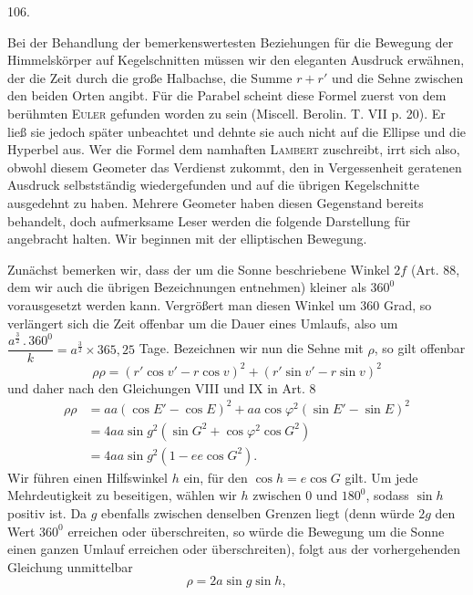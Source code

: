 \par{}\medskip
\hypertarget{native-146-article106}{}
\begin{center}106.\end{center}
Bei der Behandlung der bemerkenswertesten Beziehungen für die Bewegung der Himmelskörper auf Kegelschnitten müssen wir den eleganten Ausdruck erwähnen, der die Zeit durch die große Halbachse, die Summe $r+r'$ und die Sehne zwischen den beiden Orten angibt. Für die Parabel scheint diese Formel zuerst von dem berühmten \textsc{Euler} gefunden worden zu sein (Miscell. Berolin. T. VII p. 20). Er ließ sie jedoch später unbeachtet und dehnte sie auch nicht auf die Ellipse und die Hyperbel aus. Wer die Formel dem namhaften \textsc{Lambert} zuschreibt, irrt sich also, obwohl diesem Geometer das Verdienst zukommt, den in Vergessenheit geratenen Ausdruck selbstständig wiedergefunden und auf die übrigen Kegelschnitte ausgedehnt zu haben. Mehrere Geometer haben diesen Gegenstand bereits behandelt, doch aufmerksame Leser werden die folgende Darstellung für angebracht halten. Wir beginnen mit der elliptischen Bewegung.
\par
Zunächst bemerken wir, dass der um die Sonne beschriebene Winkel $2f$ (Art. 88, dem wir auch die übrigen Bezeichnungen entnehmen) kleiner als $360^0$ vorausgesetzt werden kann. Vergrößert man diesen Winkel um 360 Grad, so verlängert sich die Zeit offenbar um die Dauer eines Umlaufs, also um $\dfrac{a^{\frac32}\mathpunct{.}360^0}{k}=a^{\frac32}\times365{,}25$ Tage. Bezeichnen wir nun die Sehne mit $\rho$, so gilt offenbar
\[
\rho\rho=(r'\cos v'-r\cos v)^2+(r'\sin v'-r\sin v)^2
\]
\noindent und daher nach den Gleichungen VIII und IX in Art. 8
\[
\begin{aligned}
\rho\rho&=aa(\cos E'-\cos E)^2+aa\cos\varphi^2(\sin E'-\sin E)^2\\[.6em]
&=4aa\sin g^2(\sin G^2+\cos\varphi^2\cos G^2)\\[.6em]
&=4aa\sin g^2(1-ee\cos G^2).
\end{aligned}
\]
\noindent Wir führen einen Hilfswinkel $h$ ein, für den $\cos h=e\cos G$ gilt. Um jede Mehrdeutigkeit zu beseitigen, wählen wir $h$ zwischen 0 und $180^0$, sodass $\sin h$ positiv ist. Da $g$ ebenfalls zwischen denselben Grenzen liegt (denn würde $2g$ den Wert $360^0$ erreichen oder überschreiten, so würde die Bewegung um die Sonne einen ganzen Umlauf erreichen oder überschreiten), folgt aus der vorhergehenden Gleichung unmittelbar
\[
\rho=2a\sin g\sin h,
\]
